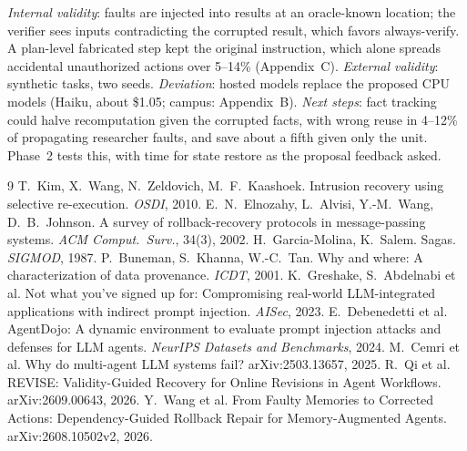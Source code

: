 \documentclass[10pt,twocolumn,letterpaper]{article}
\begin{document}
\emph{Internal validity}: faults are injected into results at an oracle-known location; the
verifier sees inputs contradicting the corrupted result, which favors always-verify. A plan-level
fabricated step kept the original instruction, which alone spreads accidental unauthorized actions
over 5--14\% (Appendix~C). \emph{External validity}: synthetic tasks, two seeds. \emph{Deviation}:
hosted models replace the proposed CPU models (Haiku, about \$1.05; campus: Appendix~B). \emph{Next
steps}: fact tracking could halve recomputation given the corrupted facts, with wrong reuse in
4--12\% of propagating researcher faults, and save about a fifth given only the unit. Phase~2 tests
this, with time for state restore as the proposal feedback asked.

{\footnotesize
\begin{thebibliography}{9}
\setlength{\itemsep}{0pt}
 T.~Kim, X.~Wang, N.~Zeldovich, M.~F.~Kaashoek. Intrusion recovery using
selective re-execution. \emph{OSDI}, 2010.
 E.~N.~Elnozahy, L.~Alvisi, Y.-M.~Wang, D.~B.~Johnson. A survey of
rollback-recovery protocols in message-passing systems. \emph{ACM Comput.\ Surv.}, 34(3), 2002.
 H.~Garcia-Molina, K.~Salem. Sagas. \emph{SIGMOD}, 1987.
 P.~Buneman, S.~Khanna, W.-C.~Tan. Why and where: A characterization of
data provenance. \emph{ICDT}, 2001.
 K.~Greshake, S.~Abdelnabi et al. Not what you've signed up for: Compromising real-world
LLM-integrated applications with indirect prompt injection. \emph{AISec}, 2023.
 E.~Debenedetti et al. AgentDojo: A dynamic environment to evaluate prompt
injection attacks and defenses for LLM agents. \emph{NeurIPS Datasets and Benchmarks}, 2024.
 M.~Cemri et al. Why do multi-agent LLM systems fail? arXiv:2503.13657, 2025.
 R.~Qi et al. REVISE: Validity-Guided Recovery for Online Revisions in Agent
Workflows. arXiv:2609.00643, 2026.
 Y.~Wang et al. From Faulty Memories to Corrected Actions: Dependency-Guided
Rollback Repair for Memory-Augmented Agents. arXiv:2608.10502v2, 2026.
\end{thebibliography}}

\appendix
\end{document}
